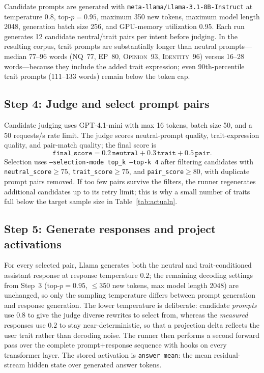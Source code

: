 \documentclass{article}
\newcommand{\ax}[1]{\texttt{#1}}   %
\begin{document}
Candidate prompts are generated with \texttt{meta-llama/Llama-3.1-8B-Instruct} at temperature $0.8$, top-$p=0.95$, maximum 350 new tokens, maximum model length 2048, generation batch size 256, and GPU-memory utilization 0.95. Each run generates 12 candidate neutral/trait pairs per intent before judging. In the resulting corpus, trait prompts are substantially longer than neutral prompts---median 77--96 words (\textsc{NQ}~77, \textsc{EP}~80, \textsc{Opinion}~93, \textsc{Identity}~96) versus 16--28 words---because they include the added trait expression; even 90th-percentile trait prompts (111--133 words) remain below the token cap.

\subsection{Step 4: Judge and select prompt pairs}

Candidate judging uses GPT-4.1-mini with max 16 tokens, batch size 50, and a 50 requests/s rate limit. The judge scores neutral-prompt quality, trait-expression quality, and pair-match quality; the final score is
\[
\texttt{final\_score}=0.2\,\texttt{neutral}+0.3\,\texttt{trait}+0.5\,\texttt{pair}.
\]
Selection uses \texttt{--selection-mode top\_k --top-k 4} after filtering candidates with \texttt{neutral\_score}$\geq75$, \texttt{trait\_score}$\geq75$, and \texttt{pair\_score}$\geq80$, with duplicate prompt pairs removed. If too few pairs survive the filters, the runner regenerates additional candidates up to its retry limit; this is why a small number of traits fall below the target sample size in Table~\ref{tab:actualn}.

\subsection{Step 5: Generate responses and project activations}

For every selected pair, Llama generates both the neutral and trait-conditioned assistant response at response temperature $0.2$; the remaining decoding settings from Step~3 (top-$p=0.95$, $\leq$350 new tokens, max model length 2048) are unchanged, so only the sampling temperature differs between prompt generation and response generation. The lower temperature is deliberate: candidate \emph{prompts} use $0.8$ to give the judge diverse rewrites to select from, whereas the \emph{measured} responses use $0.2$ to stay near-deterministic, so that a projection delta reflects the user trait rather than decoding noise. The runner then performs a second forward pass over the complete prompt+response sequence with hooks on every transformer layer. The stored activation is \ax{answer\_mean}: the mean residual-stream hidden state over generated answer tokens.
\end{document}
